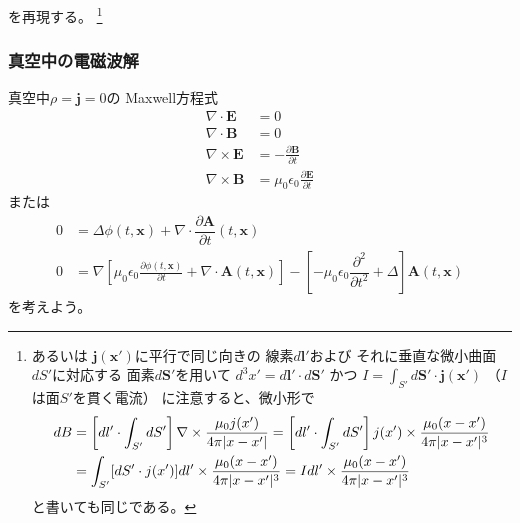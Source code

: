 を再現する。
\footnote{
  あるいは
  $\bm{j}(\bm{x}')$に平行で同じ向きの
  線素$d \bm{l}'$および
  それに垂直な微小曲面$dS'$に対応する
  面素$d \bm{S}'$を用いて
  $d^3 x' = d \bm{l}' \cdot d \bm{S}'$
  かつ
  $I = \int_{S'} d \bm{S}' \cdot \bm{j}(\bm{x}')$
  （$I$は面$S'$を貫く電流）
  に注意すると、微小形で
  \begin{align}
    d B
  &=
    \left[
      d l' \cdot
      \int_{S'} d S'
    \right]
    \nabla \times
      \dfrac{
        \mu_0 j (x')
      }{
        4 \pi
        |x - x'|
      }
  =
    \left[
      d l' \cdot
      \int_{S'} d S'
    \right]
    j (x') \times
      \dfrac{
        \mu_0
        (x - x')
      }{
        4 \pi
        |x - x'|^3
      }
  \notag\\&
  =
    \int_{S'}
      [d S' \cdot j (x')]
    d l' \times
      \dfrac{
        \mu_0
        (x - x')
      }{
        4 \pi
        |x - x'|^3
      }
  =
    I d l'
    \times
      \dfrac{
        \mu_0
        (x - x')
      }{
        4 \pi
        |x - x'|^3
      }
  \end{align}
  と書いても同じである。
}

\subsubsection{真空中の電磁波解}

真空中$\rho = \bm{j} = 0$の
Maxwell方程式
\begin{subequations}
\begin{align}
  \nabla \cdot \bm{E}
&=
  0
\\
  \nabla \cdot \bm{B}
&= 0
\\
  \nabla \times \bm{E}
&=
  - \frac{\partial \bm{B}}
    {\partial t}
\\
  \nabla \times \bm{B}
&=
  \mu_0 \epsilon_0
    \frac{\partial \bm{E}}
      {\partial t}
\end{align}
\end{subequations}
または
\begin{subequations}
\begin{align}
  0
&=
    \Delta \phi (t, \bm{x})
  +
    \nabla \cdot
    \dfrac{\partial \bm{A}}
      {\partial t} (t, \bm{x})
\\
  0
&=
  \nabla
  \left[
    \mu_0 \epsilon_0
    \frac{\partial \phi (t, \bm{x})}
      {\partial t}
  +
    \nabla \cdot
      \bm{A} (t, \bm{x})
  \right]
  -
  \left[
    - \mu_0 \epsilon_0
    \dfrac{\partial^2}{\partial t^2}
  +
    \Delta
  \right]
    \bm{A} (t, \bm{x})
\end{align}
\label{maxwell eq of potentials in vacuum}
\end{subequations}
を考えよう。

